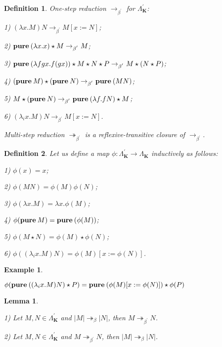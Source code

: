 \documentclass[a4paper]{article}
\newtheorem{lemma}{Lemma}
\newtheorem{defin}{Definition}
\newtheorem{ex}{Example}
\begin{document}
\begin{defin} One-step reduction $\rightarrow_{\beta^{'}}$ for $\Lambda^{'}_{\textbf{K}}$:

1) $(\lambda x. M) N \rightarrow_{\beta^{'}} M [x := N]$;

2) ${\bf pure \: } (\lambda x. x) \star M \rightarrow_{\beta^{'}} M$;

3) ${\bf pure \: } (\lambda f g x. f (g x)) \star M \star N \star P \rightarrow_{\beta^{'}} M \star (N \star
P)$;

4) $({\bf pure \: } M) \star ({\bf pure \: } N) \rightarrow_{\beta^{'}} {\bf pure \: } (M N)$;

5) $M \star ({\bf pure \: } N) \rightarrow_{\beta^{'}} {\bf pure \: } (\lambda f. f N) \star M$;

6) $(\lambda_i x. M) N \rightarrow_{\beta^{'}} M [x := N]$.


Multi-step reduction $\twoheadrightarrow_{\beta^{'}}$ is a reflexive-transitive closure of
$\rightarrow_{\beta^{'}}$.

\end{defin}

\begin{defin} Let us define a map $\phi : \Lambda^{'}_{\textbf{K}} \to \Lambda_{\textbf{K}}$ inductively as
follows:

1) $\phi(x) = x$;

2) $\phi(M N) = \phi(M)\phi(N)$;

3) $\phi(\lambda x. M) = \lambda x. \phi(M)$;

4) $\phi({\bf pure \: } M) = {\bf pure \: } (\phi(M))$;

5) $\phi(M \star N) = \phi(M) \star \phi(N)$;

6) $\phi((\lambda_i x. M) N) = \phi(M) [x := \phi(N)]$.

\end{defin}

\begin{ex}

$ $

$\phi({\bf pure \: } ((\lambda_i x. M) N) \star P) = {\bf pure \: } (\phi(M) [x := \phi(N)]) \star \phi(P)$

\end{ex}

\begin{lemma}

$ $

1) Let $M, N \in \Lambda^{'}_{\textbf{K}}$ and $|M| \twoheadrightarrow_{\beta} |N|$, then $M \twoheadrightarrow_{\beta^{'}} N$.

2) Let $M, N \in \Lambda^{'}_{\textbf{K}}$ and $M \twoheadrightarrow_{\beta^{'}} N$, then $|M| \twoheadrightarrow_{\beta} |N|$.

\end{lemma}
\end{document}
